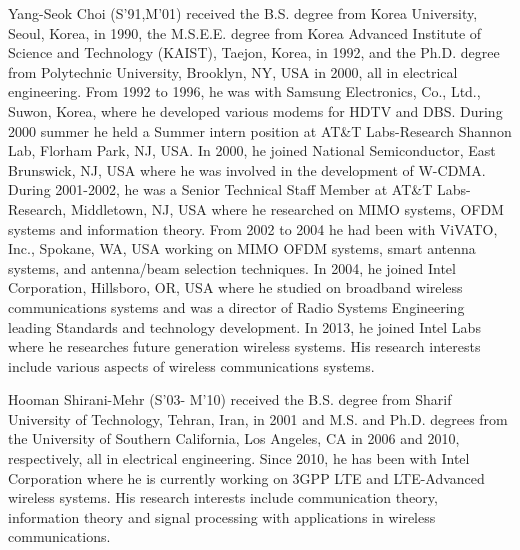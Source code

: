 \documentclass[twocolumn]{IEEEtran}
\begin{document}
\begin{IEEEbiography}{Yang-Seok
Choi} (S'91,M'01) received the B.S. degree from Korea University,
Seoul, Korea, in 1990, the M.S.E.E. degree from Korea Advanced
Institute of Science and Technology (KAIST), Taejon, Korea, in 1992,
and the Ph.D. degree from Polytechnic University, Brooklyn, NY, USA
in 2000, all in electrical engineering. From 1992 to 1996, he was
with Samsung  Electronics, Co., Ltd., Suwon, Korea, where he
developed various modems for HDTV and DBS. During 2000 summer he
held a Summer intern position at AT\&T Labs-Research Shannon Lab,
Florham Park, NJ, USA. In 2000, he joined National Semiconductor,
East Brunswick, NJ, USA where he was involved in the development of
W-CDMA. During 2001-2002, he was a Senior Technical Staff Member at
AT\&T Labs-Research, Middletown, NJ, USA where he researched on MIMO
systems, OFDM systems and information theory. From 2002 to 2004 he
had been with ViVATO, Inc., Spokane, WA, USA working on MIMO OFDM
systems, smart antenna systems, and antenna/beam selection
techniques. In 2004, he joined Intel Corporation, Hillsboro, OR, USA
where he studied on broadband wireless communications systems and
was a director of Radio Systems Engineering leading Standards and
technology development. In 2013, he joined Intel Labs where he
researches future generation wireless systems. His research
interests include various aspects of wireless communications
systems.
\end{IEEEbiography}
\begin{IEEEbiography}{Hooman
Shirani-Mehr} (S'03- M'10) received the B.S. degree from Sharif
University of Technology, Tehran, Iran, in 2001 and M.S. and Ph.D.
degrees from the University of Southern California, Los Angeles, CA
in 2006 and 2010, respectively, all in electrical engineering. Since
2010, he has been with Intel Corporation where he is currently
working on 3GPP LTE and LTE-Advanced wireless systems. His research
interests include communication theory, information theory and
signal processing with applications in wireless communications.
\end{IEEEbiography}
\end{document}
